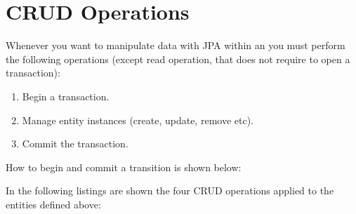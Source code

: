 \chapter{CRUD Operations}

Whenever you want to manipulate data with JPA within an  you
must perform the following operations (except read operation, that does not
require to open a transaction):

\begin{enumerate}
	\item Begin a transaction.
	\item Manage entity instances (create, update, remove etc).
	\item Commit the transaction.
\end{enumerate}

How to begin and commit a transition is shown below:





In the following listings are shown the four CRUD operations applied to the
entities defined above:





\vfill





